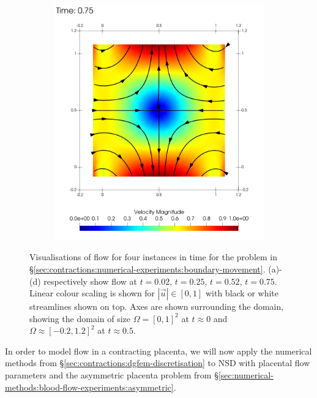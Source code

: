 \begin{figure}
\begin{centering}
\begin{subfigure}{0.45\textwidth}
\begin{centering}
                            \includegraphics[width=\textwidth]{diagrams/results-contractions/mm_5_black.0075.png}
                            \caption{}
                            \label{fig:square-solid-wall-flow:75}
                        \end{centering}
                    \end{subfigure}
                \end{centering}
                \caption{Visualisations of flow for four instances in time for the problem in \S\ref{sec:contractions:numerical-experiments:boundary-movement}. (a)-(d) respectively show flow at $t=0.02$, $t=0.25$, $t=0.52$, $t=0.75$. Linear colour scaling is shown for $|\vec{u}| \in [0, 1]$ with black or white streamlines shown on top. Axes are shown surrounding the domain, showing the domain of size $\Omega = [0, 1]^2$ at $t \approx 0$ and $\Omega \approx [-0.2, 1.2]^2$ at $t \approx 0.5$.}
                \label{fig:square-solid-wall-flow}
            \end{figure}

            In order to model flow in a contracting placenta, we will now apply the numerical methods from \S\ref{sec:contractions:dgfem-discretisation} to NSD with placental flow parameters and the asymmetric placenta problem from \S\ref{sec:numerical-methods:blood-flow-experiments:asymmetric}.

